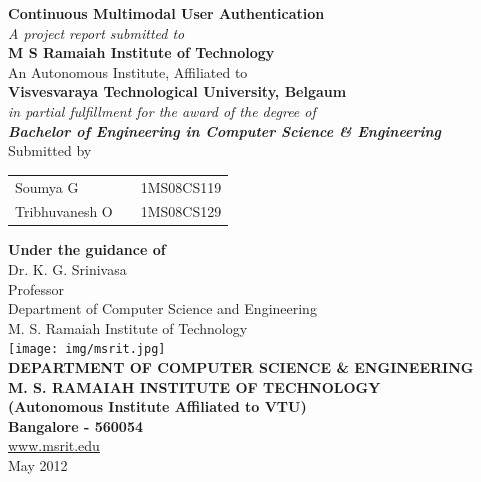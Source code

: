 \documentclass[12pt]{report}			%
\begin{document}
\begin{singlespacing}
\thispagestyle{empty}			%

\begin{center}

\thisfancypage{%
\setlength{\fboxsep}{9pt}%
\setlength{\shadowsize}{8pt}%
\doublebox}{}
\textbf{\Large Continuous Multimodal User Authentication}\\[4ex]
\textit{\large A project report submitted to}\\[2ex]
\textbf{\Large M S Ramaiah Institute of Technology}\\[2ex]
An Autonomous Institute, Affiliated to\\[2ex]
\textbf{Visvesvaraya Technological University, Belgaum}\\[2ex]
\textit{in partial fulfillment for the award of the degree of}\\[2ex]
\textbf{\textit{\large Bachelor of Engineering in Computer Science \& Engineering}}\\[4ex]
Submitted by\\[2ex]
\begin{table}[htp]
	\centering
	\begin{tabular}{lcc}
	Soumya G       &  \hspace{20 mm} & 1MS08CS119             \\
	Tribhuvanesh O &  \hspace{20 mm} & 1MS08CS129             \\ 
	\end{tabular}
\end{table}

{\bf Under the guidance of }{\bf}\\[2ex]
Dr. K. G. Srinivasa\\
Professor\\
Department of Computer Science and Engineering\\
M. S. Ramaiah Institute of Technology\\[3ex]


\texttt{[image: img/msrit.jpg]}\\
\uppercase{\textbf{Department of Computer Science \& Engineering}}\\[2ex]
\uppercase{\textbf{M. S. Ramaiah Institute of Technology}}\\
\textbf{(Autonomous Institute Affiliated to VTU)}\\
\textbf{Bangalore - 560054}\\
\url{www.msrit.edu}\\
{May 2012}
\end{center}
\end{singlespacing}
\end{document}
